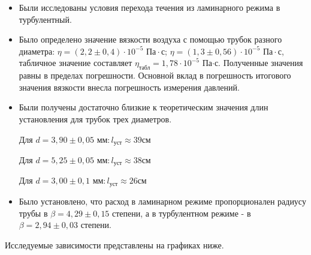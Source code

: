 \documentclass[a4paper,12pt]{article} %
\begin{document}
\begin{itemize}
	\item Были исследованы условия перехода течения из ламинарного режима в турбулентный. 
	
	
	\item Было определено значение вязкости воздуха с помощью трубок разного диаметра: $ \eta = (2,2 \pm 0,4) \cdot 10^{-5} \text{ Па} \cdot \text{с}$;
$ \eta = (1,3 \pm 0,56) \cdot 10^{-5} \text{ Па} \cdot \text{с}$, табличное значение составляет $\eta_{\text{табл}} = 1,78 \cdot 10^{-5}$ Па$\cdot$с. Полученные значения равны в пределах погрешности. Основной вклад в погрешность итогового значения вязкости внесла погрешность измерения давлений.
	
	\item Были получены достаточно близкие к теоретическим значения длин установления для трубок трех диаметров.
	
	\medskip
	
	\noindent Для $d = 3,90 \pm 0,05 \text{ мм}: l_\text{уст} \approx 39 \text{см}$

\medskip

\noindent Для $d = 5,25 \pm 0,05 \text{ мм}: l_\text{уст} \approx 38 \text{см}$

\medskip

\noindent Для $d = 3,00 \pm 0,1 \text{ мм}: l_\text{уст} \approx 26 \text{см}$

	
	\item Было установлено, что расход в ламинарном режиме пропорционален радиусу трубы в $\beta = 4,29 \pm 0,15 $ степени, а в турбулентном режиме - в $ \beta = 2,94 \pm 0,03 $ степени.

\end{itemize}

\noindent Исследуемые зависимости представлены на графиках ниже.
	
\end{document}
